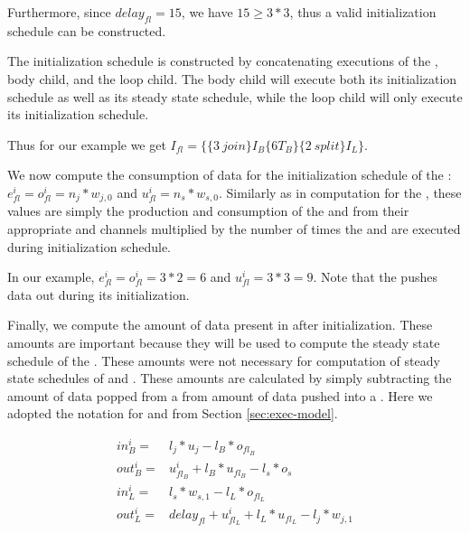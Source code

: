 Furthermore, since $delay_{fl} = 15$, we have $15 \ge 3 * 3$, thus
a valid initialization schedule can be constructed.

The initialization schedule is constructed by concatenating
executions of the {\joiner}, body child, {\splitter} and the loop
child.  The body child will execute both its initialization
schedule as well as its steady state schedule, while the loop
child will only execute its initialization schedule.

Thus for our example we get $I_{fl} = \{\{3\ join\} I_B \{6T_B\}
\{2\ split\} I_L\}$.

We now compute the consumption of data for the initialization
schedule of the {\feedbackloop}: $e^i_{fl} = o^i_{fl} = n_j *
w_{j,0}$ and $u^i_{fl} = n_s * w_{s,0}$. Similarly as in
computation for the {\splitjoin}, these values are simply the
production and consumption of the {\splitter} and {\joiner} from their
appropriate {\Input} and {\Output} channels multiplied by the number
of times the {\splitter} and {\joiner} are executed during
initialization schedule.

In our example, $e^i_{fl} = o^i_{fl} = 3 * 2 = 6$ and $u^i_{fl} =
3 * 3 = 9$.  Note that the {\feedbackloop} pushes data out during
its initialization.

Finally, we compute the amount of data present in {{\Channels}} after
initialization. These amounts are important because they will be
used to compute the steady state schedule of the {\feedbackloop}.
These amounts were not necessary for computation of steady state
schedules of {\pipeline} and {\splitjoin}. These amounts are
calculated by simply subtracting the amount of data popped from a
{{\Channel}} from amount of data pushed into a {{\Channel}}. Here we
adopted the notation for
{\Input} and {\Output} {{\Channel}} from Section \ref{sec:exec-model}.

\begin{displaymath}
\begin{array}{rl}
in^i_B = & l_j * u_j - l_B * o_{fl_B} \\
out^i_B = & u^i_{fl_B} + l_B * u_{fl_B} - l_s * o_s\\
in^i_L = & l_s * w_{s, 1} - l_L * o_{fl_L} \\
out^i_L = & delay_{fl} + u^i_{fl_L} + l_L * u_{fl_L} - l_j * w_{j,1} \\
\end{array}
\end{displaymath}


